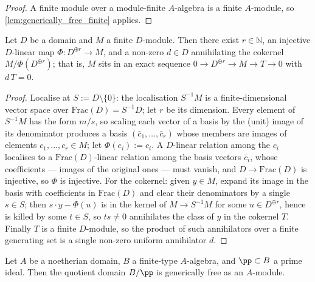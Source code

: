 \begin{proof}
\leanok
  A finite module over a module-finite \(A\)-algebra is a finite
  \(A\)-module, so \cref{lem:generically_free_finite} applies.
\end{proof}

\begin{lemma}\leanok
  \label{lem:generic_rank_comparison}
  Let \(D\) be a domain and \(M\) a finite \(D\)-module.  Then there exist
  \(r \in \mathbb{N}\), an injective \(D\)-linear map
  \(\Phi : D^{\oplus r} \to M\),
  and a non-zero \(d \in D\) annihilating the cokernel
  \(M / \Phi(D^{\oplus r})\); that is, \(M\) sits in an exact sequence
  \(0 \to D^{\oplus r} \to M \to T \to 0\) with \(d\,T = 0\).
\end{lemma}

\begin{proof}
\leanok
  Localise at \(S := D \setminus \{0\}\): the localisation \(S^{-1}M\) is a
  finite-dimensional vector space over \(\mathrm{Frac}(D) = S^{-1}D\); let
  \(r\) be its dimension.  Every element of \(S^{-1}M\) has the form
  \(m/s\), so scaling each vector of a basis by the (unit) image of its
  denominator produces a basis \((\bar c_1, \dots, \bar c_r)\) whose members
  are images of elements \(c_1, \dots, c_r \in M\); let
  \(\Phi(e_i) := c_i\).  A \(D\)-linear relation among the \(c_i\)
  localises to a \(\mathrm{Frac}(D)\)-linear relation among the basis
  vectors \(\bar c_i\), whose coefficients — images of the original ones —
  must vanish, and \(D \to \mathrm{Frac}(D)\) is injective, so \(\Phi\) is
  injective.  For the cokernel: given \(y \in M\), expand its image in the
  basis with coefficients in \(\mathrm{Frac}(D)\) and clear their
  denominators by a single \(s \in S\); then \(s \cdot y - \Phi(u)\) is in
  the kernel of \(M \to S^{-1}M\) for some \(u \in D^{\oplus r}\), hence is
  killed by some \(t \in S\), so \(ts \ne 0\) annihilates the class of
  \(y\) in the cokernel \(T\).  Finally \(T\) is a finite \(D\)-module, so
  the product of such annihilators over a finite generating set is a single
  non-zero uniform annihilator \(d\).
\end{proof}

\begin{lemma}\leanok
  \label{lem:generically_free_domain_core}
  Let \(A\) be a noetherian domain, \(B\) a finite-type \(A\)-algebra, and
  \(\pp \subset B\) a prime ideal.  Then the quotient domain \(B/\pp\) is
  generically free as an \(A\)-module.
\end{lemma}

